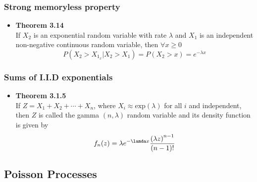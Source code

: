 \documentclass[11pt,a4paper]{article}
\begin{document}
\subsubsection{Strong memoryless property}
\begin{itemize}
    \item \textbf{Theorem 3.14} \\
        If $X_2$ is an exponential random variable with rate $\lambda$ and $X_1$
        is an independent non-negative continuous random variable, then $\forall x \geq 0$
        \[
            P(X_2 > X_1 _ x | X_2 > X_1) = P(X_2 > x) = e^{-\lambda x}
        \]
\end{itemize}

\subsubsection{Sums of I.I.D exponentials}

\begin{itemize}
    \item \textbf{Theorem 3.1.5} \\
        If $Z = X_1 + X_2 + \cdots + X_n$, where $X_i \approx \text{exp}(\lambda)$ for all $i$
        and independent, then $Z$ is called the gamma $(n, \lambda)$ random variable and its
        density function is given by
        \[
            f_n(z) = \lambda e^{-\lamda x} \frac{{(\lambda z)}^{n-1}}{(n-1)!}
        \]
\end{itemize}

\subsection{Poisson Processes}
\end{document}
